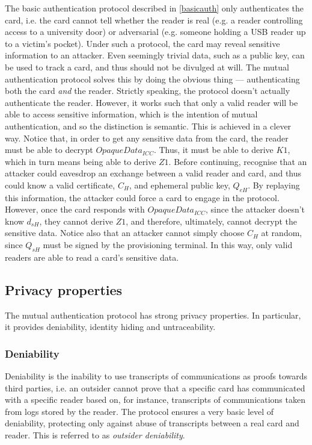 \documentclass[12pt,a4paper,twoside,openright]{report}
\begin{document}
The basic authentication protocol described in \autoref{basicauth} only authenticates the card, i.e. the card cannot tell whether the reader is real (e.g. a reader controlling access to a university door) or adversarial (e.g. someone holding a USB reader up to a victim's pocket). Under such a protocol, the card may reveal sensitive information to an attacker. Even seemingly trivial data, such as a public key, can be used to track a card, and thus should not be divulged at will. The mutual authentication protocol solves this by doing the obvious thing --- authenticating both the card \emph{and} the reader. Strictly speaking, the protocol doesn't actually authenticate the reader. However, it works such that only a valid reader will be able to access sensitive information, which is the intention of mutual authentication, and so the distinction is semantic. This is achieved in a clever way. Notice that, in order to get any sensitive data from the card, the reader must be able to decrypt $OpaqueData_{ICC}$. Thus, it must be able to derive $K1$, which in turn means being able to derive $Z1$. Before continuing, recognise that an attacker could eavesdrop an exchange between a valid reader and card, and thus could know a valid certificate, $C_{H}$, and ephemeral public key, $Q_{eH}$. By replaying this information, the attacker could force a card to engage in the protocol. However, once the card responds with $OpaqueData_{ICC}$, since the attacker doesn't know $d_{sH}$, they cannot derive $Z1$, and therefore, ultimately, cannot decrypt the sensitive data. Notice also that an attacker cannot simply choose $C_{H}$ at random, since $Q_{sH}$ must be signed by the provisioning terminal. In this way, only valid readers are able to read a card's sensitive data.

\subsection{Privacy properties}

The mutual authentication protocol has strong privacy properties. In particular, it provides deniability, identity hiding and untraceability.

\subsubsection{Deniability}

Deniability is the inability to use transcripts of communications as proofs towards third parties, i.e. an outsider cannot prove that a specific card has communicated with a specific reader based on, for instance, transcripts of communications taken from logs stored by the reader. The protocol ensures a very basic level of deniability, protecting only against abuse of transcripts between a real card and reader. This is referred to as \emph{outsider deniability}.
\end{document}
